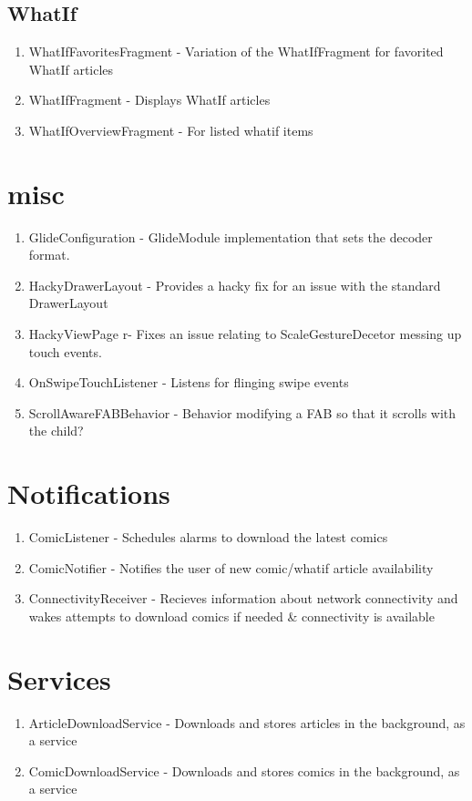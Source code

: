 \documentclass{article}
\begin{document}
\subsection{WhatIf}
\begin{enumerate}
\item WhatIfFavoritesFragment - Variation of the WhatIfFragment for favorited WhatIf articles
\item WhatIfFragment - Displays WhatIf articles
\item WhatIfOverviewFragment - For listed whatif items
\end{enumerate}

\section{misc}
\begin{enumerate}
\item GlideConfiguration - GlideModule implementation that sets the decoder format.
\item HackyDrawerLayout - Provides a hacky fix for an issue with the standard DrawerLayout
\item HackyViewPage r- Fixes an issue relating to ScaleGestureDecetor messing up touch events. 
\item OnSwipeTouchListener - Listens for flinging swipe events
\item ScrollAwareFABBehavior - Behavior modifying a FAB so that it scrolls with the child?
\end{enumerate}

\section{Notifications}
\begin{enumerate}
\item ComicListener - Schedules alarms to download the latest comics
\item ComicNotifier - Notifies the user of new comic/whatif article availability
\item ConnectivityReceiver - Recieves information about network connectivity and wakes attempts to download comics if needed \& connectivity is available
\end{enumerate}
\section{Services}
\begin{enumerate}
\item ArticleDownloadService - Downloads and stores articles in the background, as a service
\item ComicDownloadService - Downloads and stores comics in the background, as a service
\end{enumerate}
\end{document}
